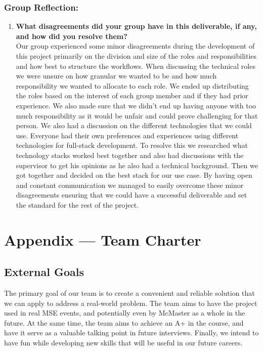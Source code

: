 \documentclass{article}
\begin{document}
\subsubsection*{Group Reflection:}
\begin{enumerate}
  \item \textbf{What disagreements did your group have in this deliverable, if any, and how did you resolve them?} \\
  Our group experienced some minor disagreements during the development of this project primarily on the division and size of the roles and responsibilities and how best to structure the workflows. When discussing the technical roles we were unsure on how granular we wanted to be and how much responsibility we wanted to allocate to each role. We ended up distributing the roles based on the interest of each group member and if they had prior experience. We also made sure that we didn't end up having anyone with too much responsibility as it would be unfair and could prove challenging for that person. We also had a discussion on the different technologies that we could use. Everyone had their own preferences and experiences using different technologies for full-stack development. To resolve this we researched what technology stacks worked best together and also had discussions with the supervisor to get his opinions as he also had a technical background. Then we got together and decided on the best stack for our use case. By having open and constant communication we managed to easily overcome these minor disagreements ensuring that we could have a successful deliverable and set the standard for the rest of the project.
\end{enumerate}
\newpage{}

\section*{Appendix --- Team Charter}


\subsection*{External Goals}

The primary goal of our team is to create a convenient and reliable solution that we can apply to address a real-world problem. The team aims to have the project used in real MSE events, and potentially even by McMaster as a whole in the future. At the same time, the team aims to achieve an A+ in the course, and have it serve as a valuable talking point in future interviews. Finally, we intend to have fun while developing new skills that will be useful in our future careers.
\end{document}
